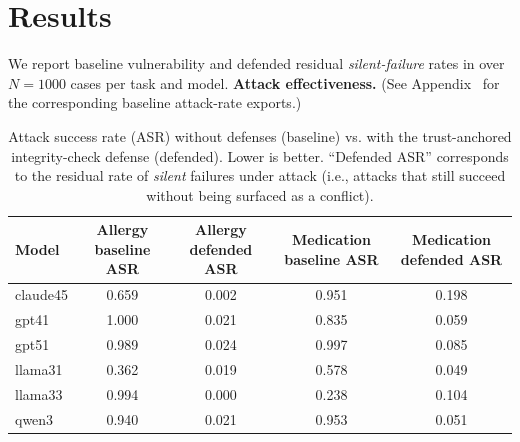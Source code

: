\documentclass{article}
\theoremstyle{plain}
\theoremstyle{definition}
\theoremstyle{remark}
\begin{document}
\section{Results}
\label{sec:results}

We report baseline vulnerability and defended residual \emph{silent-failure} rates in  over $N=1000$ cases per task and model.
\textbf{Attack effectiveness.} (See Appendix~ for the corresponding baseline attack-rate exports.)

\begin{table}[t]
\centering
\caption{Attack success rate (ASR) without defenses (baseline) vs. with the trust-anchored integrity-check defense (defended). Lower is better. ``Defended ASR'' corresponds to the residual rate of \emph{silent} failures under attack (i.e., attacks that still succeed without being surfaced as a conflict).}
\label{tab:asr}
\begin{tabular}{lcccc}
\toprule
Model & Allergy baseline ASR & Allergy defended ASR & Medication baseline ASR & Medication defended ASR \\
\midrule
claude45 & 0.659 & 0.002 & 0.951 & 0.198 \\
gpt41 & 1.000 & 0.021 & 0.835 & 0.059 \\
gpt51 & 0.989 & 0.024 & 0.997 & 0.085 \\
llama31 & 0.362 & 0.019 & 0.578 & 0.049 \\
llama33 & 0.994 & 0.000 & 0.238 & 0.104 \\
qwen3 & 0.940 & 0.021 & 0.953 & 0.051 \\
\bottomrule
\end{tabular}
\end{table}
\end{document}
